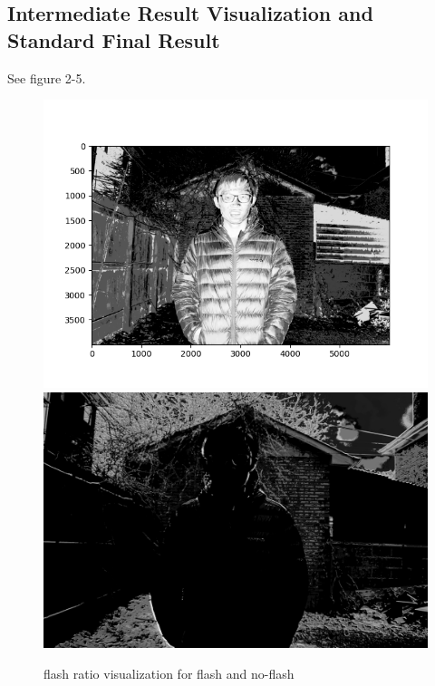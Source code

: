 \documentclass[final]{cvpr}
\begin{document}
\subsection{Intermediate Result Visualization and Standard Final Result}
See figure 2-5.
\begin{figure}[ht]
   \centering
   \includegraphics[scale=0.035]{../data/output/arthas_nf_ratio.png}
   \includegraphics[scale=0.035]{../data/output/arthas_f_ratio.png}
   \caption{flash ratio visualization for flash and no-flash}
\end{figure}
\end{document}
